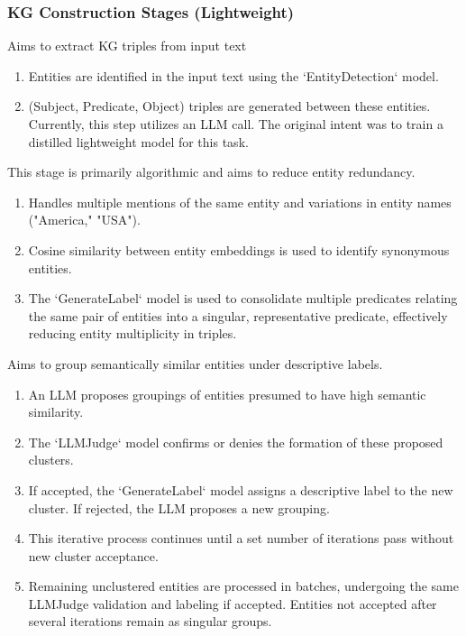 \documentclass{article}
\begin{document}
\subsubsection{KG Construction Stages (Lightweight)}
\begin{description}[noitemsep,topsep=0pt]
    \item[Generation:] Aims to extract KG triples from input text
        \begin{enumerate}[noitemsep,topsep=0pt,label=\arabic*.]
            \item Entities are identified in the input text using the `EntityDetection` model.
            \item (Subject, Predicate, Object) triples are generated between these entities. Currently, this step utilizes an LLM call. The original intent was to train a distilled lightweight model for this task.
        \end{enumerate}
    \item[Aggregation:] This stage is primarily algorithmic and aims to reduce entity redundancy.
        \begin{enumerate}[noitemsep,topsep=0pt,label=\arabic*.]
            \item Handles multiple mentions of the same entity and variations in entity names ("America," "USA").
            \item Cosine similarity between entity embeddings is used to identify synonymous entities.
            \item The `GenerateLabel` model is used to consolidate multiple predicates relating the same pair of entities into a singular, representative predicate, effectively reducing entity multiplicity in triples.
        \end{enumerate}
    \item[Clustering:] Aims to group semantically similar entities under descriptive labels.
        \begin{enumerate}[noitemsep,topsep=0pt,label=\arabic*.]
            \item An LLM proposes groupings of entities presumed to have high semantic similarity.
            \item The `LLMJudge` model confirms or denies the formation of these proposed clusters.
            \item If accepted, the `GenerateLabel` model assigns a descriptive label to the new cluster. If rejected, the LLM proposes a new grouping.
            \item This iterative process continues until a set number of iterations pass without new cluster acceptance.
            \item Remaining unclustered entities are processed in batches, undergoing the same LLMJudge validation and labeling if accepted. Entities not accepted after several iterations remain as singular groups.
        \end{enumerate}
\end{description}
\end{document}
